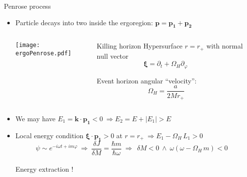 \documentclass[9pt]{beamer}
\begin{document}
\begin{frame}[fragile]{Penrose process}
    \begin{itemize}
        \setlength\itemsep{0.8em}
        \item Particle decays into two inside the ergoregion: $\bm{p} = \bm{p_1} + \bm{p_2}$
        \vspace{0.1cm}
        \begin{columns}[T,onlytextwidth]        
            \begin{column}{0.7\textwidth}
                \centering
                \texttt{[image: ergoPenrose.pdf]}
            \end{column}
            \hfill
            \begin{column}{0.26\textwidth}
                \vspace*{0.5cm}
                \begin{block}{\small Killing horizon}
                    \footnotesize Hypersurface $r=r_{+}$ with normal null vector $$\bm{\xi} = \partial_t + \Omega_H \partial_\varphi \,\qquad$$ 
                    
                    Event horizon angular ``velocity''\texttt{}:
                    $$\Omega_H = \frac{a}{2 M r_+} \qquad$$
                \end{block}
            \end{column}
        \end{columns}
        \vspace{0.3cm}
        \item We may have $E_1 = \bm{k} \cdot \bm{p_1} < 0 ~\Rightarrow E_2 = E + |E_1| > E $
        \item Local energy condition $\bm{\xi}\cdot\bm{p_1}>0$ at $r=r_{+} ~\Rightarrow E_1 - \Omega_H \, L_1 > 0$
        $$ \psi \sim e^{-i \omega t + i m \varphi} ~\Rightarrow~ \frac{\delta J}{\delta M} = \frac{\hbar m}{\hbar \omega} ~\Rightarrow~ \boxed{~\delta M < 0 ~\land~ \omega( \omega - \Omega_H \,m) < 0~} $$\\
        \hspace*{6.0cm}\alert{Energy extraction !}
    \end{itemize}
\end{frame}
\end{document}
